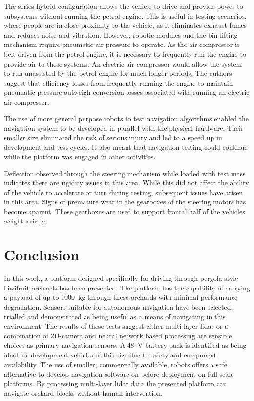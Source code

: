 \documentclass[preprint,authoryear,12pt]{elsarticle}
\begin{document}
    The series-hybrid configuration allows the vehicle to drive and provide power to subsystems without running the petrol engine.
    This is useful in testing scenarios, where people are in close proximity to the vehicle, as it eliminates exhaust fumes and reduces noise and vibration.
    However, robotic modules and the bin lifting mechanism require pneumatic air pressure to operate.
    As the air compressor is belt driven from the petrol engine, it is necessary to frequently run the engine to provide air to these systems.
    An electric air compressor would allow the system to run unassisted by the petrol engine for much longer periods.
    The authors suggest that efficiency losses from frequently running the engine to maintain pneumatic pressure outweigh conversion losses associated with running an electric air compressor.

    The use of more general purpose robots to test navigation algorithms enabled the navigation system to be developed in parallel with the physical hardware.
    Their smaller size eliminated the risk of serious injury and led to a speed up in development and test cycles.
    It also meant that navigation testing could continue while the platform was engaged in other activities.

    Deflection observed through the steering mechanism while loaded with test mass indicates there are rigidity issues in this area.
    While this did not affect the ability of the vehicle to accelerate or turn during testing, subsequent issues have arisen in this area.
    Signs of premature wear in the gearboxes of the steering motors has become aparent.
    These gearboxes are used to support frontal half of the vehicles weight axially.


\section{Conclusion}
    In this work, a platform designed specifically for driving through pergola style kiwifruit orchards has been presented.
    The platform has the capability of carrying a payload of up to \SI{1000}{\kilo\gram} through these orchards with minimal performance degradation.
    Sensors suitable for autonomous navigation have been selected, trialled and demonstrated as being useful as a means of navigating in this environment.
    The results of these tests suggest either multi-layer lidar or a combination of 2D-camera and neural network based processing are sensible choices as primary navigation sensors.
    A \SI{48}{\volt} battery pack is identified as being ideal for development vehicles of this size due to safety and component availability.
    The use of smaller, commercially available, robots offers a safe alternative to develop navigation software on before deployment on full scale platforms.
    By processing multi-layer lidar data the presented platform can navigate orchard blocks without human intervention.
\end{document}
